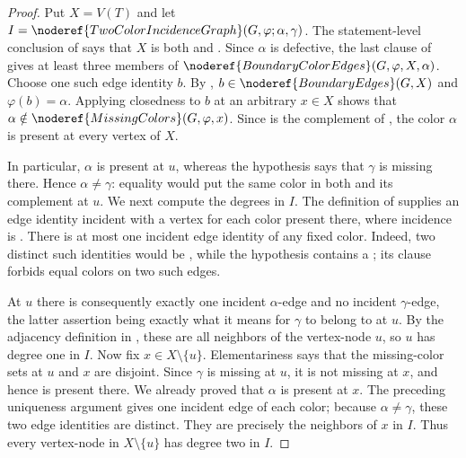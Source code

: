 \begin{proof}
Put $X=V(T)$ and let
$I=\noderef{TwoColorIncidenceGraph}(G,\varphi;\alpha,\gamma)$.  The
statement-level conclusion of  says
that $X$ is both  and
.  Since $\alpha$ is defective, the last
clause of  gives at least three
members of
$\noderef{BoundaryColorEdges}(G,\varphi,X,\alpha)$.  Choose one such edge
identity $b$.  By ,
$b\in\noderef{BoundaryEdges}(G,X)$ and $\varphi(b)=\alpha$.  Applying
closedness to $b$ at an arbitrary $x\in X$ shows that
$\alpha\notin\noderef{MissingColors}(G,\varphi,x)$.  Since
 is the complement of
, the color $\alpha$ is present at every vertex of
$X$.

In particular, $\alpha$ is present at $u$, whereas the hypothesis says
that $\gamma$ is missing there.  Hence $\alpha\ne\gamma$: equality would
put the same color in both  and its complement
 at $u$.  We next compute the degrees in $I$.
The definition of  supplies an edge identity
incident with a vertex for each color present there, where incidence is
.  There is at most one incident edge identity of any
fixed color.  Indeed, two distinct such identities would be
, while the 
hypothesis contains a ; its
 clause forbids equal colors on two such
edges.

At $u$ there is consequently exactly one incident $\alpha$-edge and no
incident $\gamma$-edge, the latter assertion being exactly what it means
for $\gamma$ to belong to  at $u$.  By the
adjacency definition in , these are all
neighbors of the vertex-node $u$, so $u$ has degree one in $I$.  Now fix
$x\in X\setminus\{u\}$.  Elementariness says that the missing-color sets
at $u$ and $x$ are disjoint.  Since $\gamma$ is missing at $u$, it is not
missing at $x$, and hence is present there.  We already proved that
$\alpha$ is present at $x$.  The preceding uniqueness argument gives one
incident edge of each color; because $\alpha\ne\gamma$, these two edge
identities are distinct.  They are precisely the neighbors of $x$ in
$I$.  Thus every vertex-node in $X\setminus\{u\}$ has degree two in $I$.


\end{proof}
